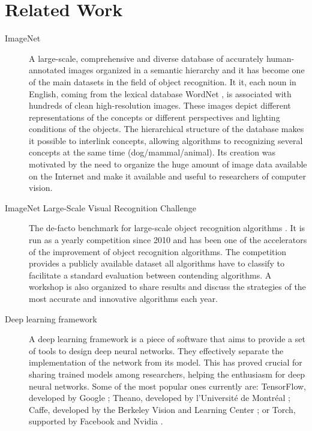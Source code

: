 
\chapter{Related Work}
\label{sec:related}

\begin{description}
  \item[ImageNet]
  A large-scale, comprehensive and diverse database of accurately human-annotated images organized in a semantic hierarchy \cite{Deng2009} and it has become one of the main datasets in the field of object recognition.
  It it, each noun in English, coming from the lexical database WordNet \cite{Wilkniss1998}, is associated with hundreds of clean high-resolution images.
  These images depict different representations of the concepts or different perspectives and lighting conditions of the objects.
  The hierarchical structure of the database makes it possible to interlink concepts, allowing algorithms to recognizing several concepts at the same time (dog/mammal/animal).
  Its creation was motivated by the need to organize the huge amount of image data available on the Internet and make it available and useful to researchers of computer vision.

  \item[ImageNet Large-Scale Visual Recognition Challenge]
  The de-facto benchmark for large-scale object recognition algorithms \cite{Russakovsky2015}.
  It is run as a yearly competition since 2010 and has been one of the accelerators of the improvement of object recognition algorithms.
  The competition provides a publicly available dataset all algorithms have to classify to facilitate a standard evaluation between contending algorithms.
  A workshop is also organized to share results and discuss the strategies of the most accurate and innovative algorithms each year.

  \item[Deep learning framework]
  A deep learning framework is a piece of software that aims to provide a set of tools to design deep neural networks.
  They effectively separate the implementation of the network from its model.
  This has proved crucial for sharing trained models among researchers, helping the enthusiasm for deep neural networks.
  Some of the most popular ones currently are: TensorFlow, developed by Google \cite{Abadi2015}; Theano, developed by l’Université de Montréal \cite{Bergstra2010}; Caffe, developed by the Berkeley Vision and Learning Center \cite{Jia2014}; or Torch, supported by Facebook and Nvidia \cite{Collobert2002}.
\end{description}
